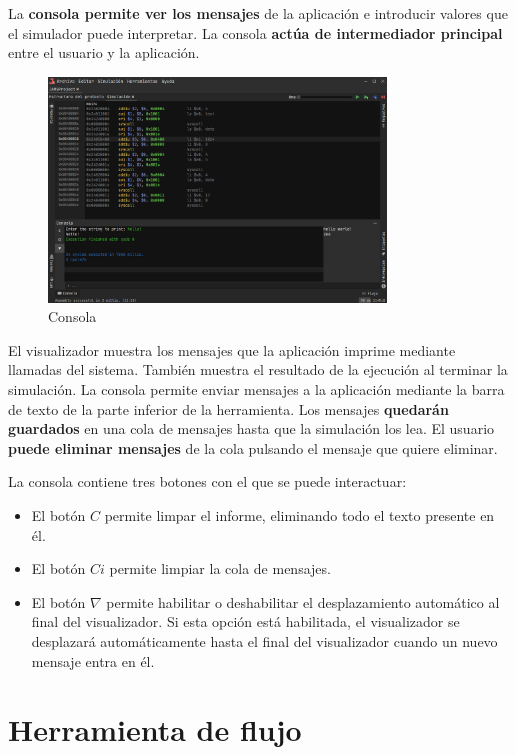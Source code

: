 La \textbf{consola permite ver los mensajes} de la aplicación
e introducir valores que el simulador puede interpretar.
La consola \textbf{actúa de intermediador principal}
entre el usuario y la aplicación.

\begin{figure}[H]
    \centering
    \includegraphics[width=0.8\textwidth]{images/tools/jams-console}
    \caption{Consola}
    \label{fig:jams-console}
\end{figure}

\noindent El visualizador muestra los mensajes que la aplicación
imprime mediante llamadas del sistema.
También muestra el resultado de la ejecución al terminar la simulación.
La consola permite enviar mensajes a la aplicación mediante la barra de
texto de la parte inferior de la herramienta.
Los mensajes \textbf{quedarán guardados} en una cola de mensajes
hasta que la simulación los lea.
El usuario \textbf{puede eliminar mensajes} de la cola
pulsando el mensaje que quiere eliminar.

\noindent La consola contiene tres botones con el que se puede interactuar:
\begin{itemize}
    \item El botón $C$ permite limpar el informe, eliminando todo el
    texto presente en él.
    \item El botón $Ci$ permite limpiar la cola de mensajes.
    \item El botón $\nabla$ permite habilitar o deshabilitar el desplazamiento
    automático al final del visualizador.
    Si esta opción está habilitada, el visualizador se desplazará
    automáticamente hasta el final del visualizador cuando un
    nuevo mensaje entra en él.
\end{itemize}

\section{Herramienta de flujo}\label{sec:herramienta-de-flujo}

